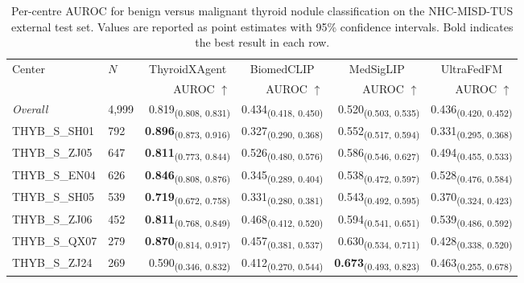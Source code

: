 \begin{table}[p]
\centering
\caption{Per-centre AUROC for benign versus malignant thyroid nodule classification on the NHC-MISD-TUS external test set. Values are reported as point estimates with 95\% confidence intervals. Bold indicates the best result in each row.}
\label{tab:binary_auroc}
\footnotesize
\setlength{\tabcolsep}{4pt}
\begin{tabular}{llrrrr}
\toprule
\multirow{2}{*}{Center} & \multirow{2}{*}{$N$} & \multicolumn{1}{c}{ThyroidXAgent} & \multicolumn{1}{c}{BiomedCLIP} & \multicolumn{1}{c}{MedSigLIP} & \multicolumn{1}{c}{UltraFedFM} \\
\cmidrule(lr){3-3} \cmidrule(lr){4-4} \cmidrule(lr){5-5} \cmidrule(lr){6-6}
 & & AUROC $\uparrow$ & AUROC $\uparrow$ & AUROC $\uparrow$ & AUROC $\uparrow$ \\
\midrule
\textit{Overall} & 4,999 & 0.819\textsubscript{(0.808, 0.831)} & 0.434\textsubscript{(0.418, 0.450)} & 0.520\textsubscript{(0.503, 0.535)} & 0.436\textsubscript{(0.420, 0.452)} \\
\midrule
THYB\_S\_SH01 & 792 & \textbf{0.896}\textsubscript{(0.873, 0.916)} & 0.327\textsubscript{(0.290, 0.368)} & 0.552\textsubscript{(0.517, 0.594)} & 0.331\textsubscript{(0.295, 0.368)} \\
THYB\_S\_ZJ05 & 647 & \textbf{0.811}\textsubscript{(0.773, 0.844)} & 0.526\textsubscript{(0.480, 0.576)} & 0.586\textsubscript{(0.546, 0.627)} & 0.494\textsubscript{(0.455, 0.533)} \\
THYB\_S\_EN04 & 626 & \textbf{0.846}\textsubscript{(0.808, 0.876)} & 0.345\textsubscript{(0.289, 0.404)} & 0.538\textsubscript{(0.472, 0.597)} & 0.528\textsubscript{(0.476, 0.584)} \\
THYB\_S\_SH05 & 539 & \textbf{0.719}\textsubscript{(0.672, 0.758)} & 0.331\textsubscript{(0.280, 0.381)} & 0.543\textsubscript{(0.492, 0.595)} & 0.370\textsubscript{(0.324, 0.423)} \\
THYB\_S\_ZJ06 & 452 & \textbf{0.811}\textsubscript{(0.768, 0.849)} & 0.468\textsubscript{(0.412, 0.520)} & 0.594\textsubscript{(0.541, 0.651)} & 0.539\textsubscript{(0.486, 0.592)} \\
THYB\_S\_QX07 & 279 & \textbf{0.870}\textsubscript{(0.814, 0.917)} & 0.457\textsubscript{(0.381, 0.537)} & 0.630\textsubscript{(0.534, 0.711)} & 0.428\textsubscript{(0.338, 0.520)} \\
THYB\_S\_ZJ24 & 269 & 0.590\textsubscript{(0.346, 0.832)} & 0.412\textsubscript{(0.270, 0.544)} & \textbf{0.673}\textsubscript{(0.493, 0.823)} & 0.463\textsubscript{(0.255, 0.678)} \\

\end{tabular}
\end{table}
